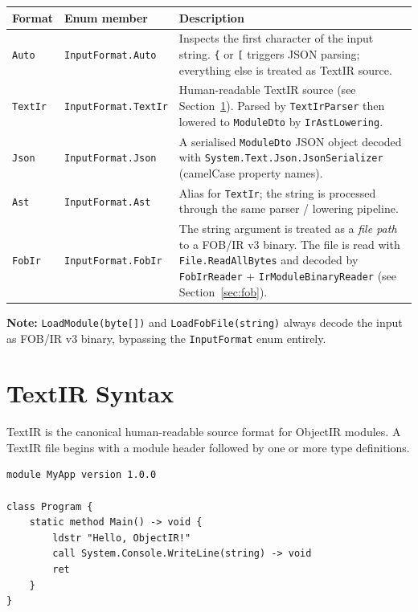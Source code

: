 \documentclass[11pt,a4paper]{article}
\newcommand{\code}[1]{\texttt{\small #1}}
\newcommand{\typename}[1]{\textcolor{typecolor}{\texttt{\small #1}}}
\begin{document}
\begin{longtable}{llp{8.5cm}}
  \toprule
  \textbf{Format} & \textbf{Enum member} & \textbf{Description} \\
  \midrule
  \endhead
  \code{Auto}   & \code{InputFormat.Auto}   &
    Inspects the first character of the input string. \texttt{\{} or
    \texttt{[} triggers JSON parsing; everything else is treated as TextIR
    source. \\[0.3em]
  \code{TextIr} & \code{InputFormat.TextIr} &
    Human-readable TextIR source (see Section~\ref{sec:textir}). Parsed by
    \typename{TextIrParser} then lowered to \typename{ModuleDto} by
    \typename{IrAstLowering}. \\[0.3em]
  \code{Json}   & \code{InputFormat.Json}   &
    A serialised \typename{ModuleDto} JSON object decoded with
    \code{System.Text.Json.JsonSerializer} (camelCase property names). \\[0.3em]
  \code{Ast}    & \code{InputFormat.Ast}    &
    Alias for \code{TextIr}; the string is processed through the same
    parser / lowering pipeline. \\[0.3em]
  \code{FobIr}  & \code{InputFormat.FobIr}  &
    The string argument is treated as a \emph{file path} to a FOB/IR v3
    binary. The file is read with \code{File.ReadAllBytes} and decoded by
    \typename{FobIrReader} + \typename{IrModuleBinaryReader}
    (see Section~\ref{sec:fob}). \\
  \bottomrule
\end{longtable}

\begin{notebox}
\textbf{Note:} \code{LoadModule(byte[])} and \code{LoadFobFile(string)} always
decode the input as FOB/IR v3 binary, bypassing the \typename{InputFormat}
enum entirely.
\end{notebox}

\section{TextIR Syntax}
\label{sec:textir}

TextIR is the canonical human-readable source format for ObjectIR modules. A
TextIR file begins with a module header followed by one or more type
definitions.

\begin{lstlisting}[style=textir, caption={Minimal TextIR module}]
module MyApp version 1.0.0

class Program {
    static method Main() -> void {
        ldstr "Hello, ObjectIR!"
        call System.Console.WriteLine(string) -> void
        ret
    }
}
\end{lstlisting}
\end{document}
